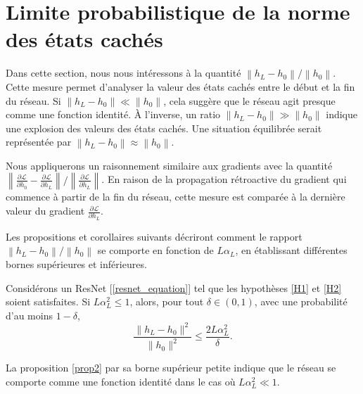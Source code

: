 \section{Limite probabilistique de la norme des états cachés}

Dans cette section, nous nous intéressons à la quantité $ {\left\| h_L - h_0 \right\|} / {\left\| h_0 \right\|}$. Cette mesure permet d'analyser la valeur des états cachés entre le début et la fin du réseau. Si $\left\| h_L - h_0 \right\| \ll \left\| h_0 \right\|$, cela suggère que le réseau agit presque comme une fonction identité. À l'inverse, un ratio $\left\| h_L - h_0 \right\| \gg \left\| h_0 \right\|$ indique une explosion des valeurs des états cachés. Une situation équilibrée serait représentée par $\left\| h_L - h_0 \right\| \approx \left\| h_0 \right\|$.

Nous appliquerons un raisonnement similaire aux gradients avec la quantité ${\left\| \frac{\partial \mathcal{L}}{\partial h_0} - \frac{\partial \mathcal{L}}{\partial h_L} \right\|} / {\left\| \frac{\partial \mathcal{L}}{\partial h_L} \right\|}$. En raison de la propagation rétroactive du gradient qui commence à partir de la fin du réseau, cette mesure est comparée à la dernière valeur du gradient $\frac{\partial \mathcal{L}}{\partial h_L}$.

Les propositions et corollaires suivants décriront comment le rapport ${\left\| h_L - h_0 \right\|} / {\left\| h_0 \right\|}$ se comporte en fonction de $L\alpha_L$, en établissant différentes bornes supérieures et inférieures.


\begin{proposition}\label{prop2}
    Considérons un ResNet [\ref{resnet_equation}] tel que les hypothèses \ref{H1} et \ref{H2} soient satisfaites.
    Si \( L\alpha_L^2 \leq 1 \), alors, pour tout \( \delta \in (0, 1) \), avec une probabilité d'au moins \( 1 - \delta \),
    \[
        \frac{\|h_L - h_0\|^2}{\|h_0\|^2} \leq \frac{2L\alpha_L^2}{\delta}
    .\]
\end{proposition}
La proposition \ref{prop2} par sa borne supérieur petite indique que le réseau se comporte comme une fonction identité dans le cas où $ L \alpha ^2 _L \ll 1 $.

